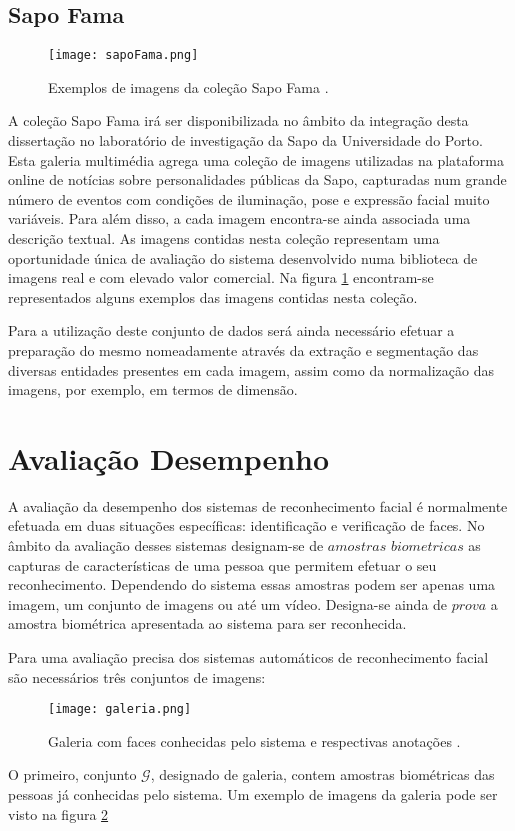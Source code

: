 \subsection{Sapo Fama}
\begin{figure}[ht]
  \begin{center}
    \leavevmode
    \texttt{[image: sapoFama.png]}
    \caption{Exemplos de imagens da coleção Sapo Fama \cite{PTC2011}.}	
    \label{fig:sapoFama}
  \end{center}
\end{figure}
A coleção Sapo Fama irá ser disponibilizada no âmbito da integração desta dissertação no laboratório de investigação da Sapo da Universidade do Porto. Esta galeria multimédia agrega uma coleção de imagens utilizadas na plataforma online de notícias sobre personalidades públicas da Sapo, capturadas num grande número de eventos com condições de iluminação, pose e expressão facial muito variáveis. Para além disso, a cada imagem encontra-se ainda associada uma descrição textual. As imagens contidas nesta coleção representam uma oportunidade única de avaliação do sistema desenvolvido numa biblioteca de imagens real e com elevado valor comercial. Na figura \ref{fig:sapoFama} encontram-se representados alguns exemplos das imagens contidas nesta coleção.

Para a utilização deste conjunto de dados será ainda necessário efetuar a preparação do mesmo nomeadamente através da extração e segmentação das diversas entidades presentes em cada imagem, assim como da normalização das imagens, por exemplo, em termos de dimensão.

\section{Avaliação Desempenho}
A avaliação da desempenho dos sistemas de reconhecimento facial é normalmente efetuada em duas situações específicas: identificação e verificação de faces. No âmbito da avaliação desses sistemas designam-se de $amostras$ $biometricas$ as capturas de características de uma pessoa que permitem efetuar o seu reconhecimento. Dependendo do sistema essas amostras podem ser apenas uma imagem, um conjunto de imagens ou até um vídeo. Designa-se ainda de $prova$ a amostra biométrica apresentada ao sistema para ser reconhecida.

Para uma avaliação precisa dos sistemas automáticos de reconhecimento facial são necessários três conjuntos de imagens:
\begin{figure}[ht]
  \begin{center}
    \leavevmode
    \texttt{[image: galeria.png]}
    \caption{Galeria com faces conhecidas pelo sistema e respectivas anotações \cite{UniversityofMassachussets}.}	
    \label{fig:galeria}
  \end{center}
\end{figure}
O primeiro, conjunto $\mathscr{G}$, designado de galeria, contem amostras biométricas das pessoas já conhecidas pelo sistema. Um exemplo de imagens da galeria pode ser visto na figura \ref{fig:galeria}

